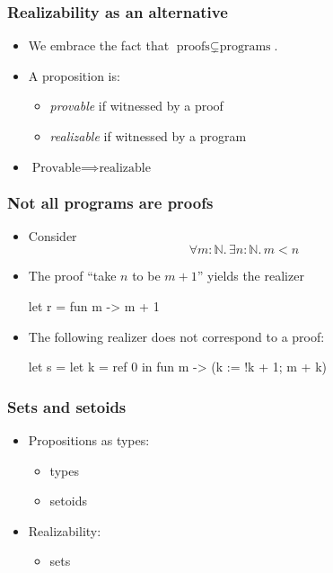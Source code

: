 \documentclass[t]{beamer}
\newcommand{\NN}{\mathbb{N}}
\begin{document}
\begin{frame}
  \frametitle{Realizability as an alternative}

  \begin{itemize}
  \item We embrace the fact that $\text{proofs} \subsetneq \text{programs}$.
  \item A proposition is:
    \begin{itemize}
    \item \emph{provable} if witnessed by a proof
    \item \emph{realizable} if witnessed by a program
    \end{itemize}
  \item $\text{Provable} \implies \text{realizable}$
  \end{itemize}

\end{frame}

\begin{frame}[fragile]
  \frametitle{Not all programs are proofs}

  \begin{itemize}
  \item Consider
    \begin{equation*}
      \forall m : \NN .\, \exists n : \NN .\, m < n
    \end{equation*}
  \item The proof ``take $n$ to be $m+1$'' yields the realizer
\begin{source}
  let r = fun m -> m + 1      
\end{source}
  \item The following realizer does not correspond to a proof:
\begin{source}
  let s =
    let k = ref 0 in
      fun m -> (k := !k + 1; m + k)
\end{source}
    \end{itemize}
\end{frame}

\begin{frame}
  \frametitle{Sets and setoids}

  \begin{itemize}
  \item Propositions as types:
    \begin{itemize}
    \item types
    \item setoids
    \end{itemize}
  \item Realizability:
    \begin{itemize}
    \item sets
    \end{itemize}
  \end{itemize}

\end{frame}
\end{document}
